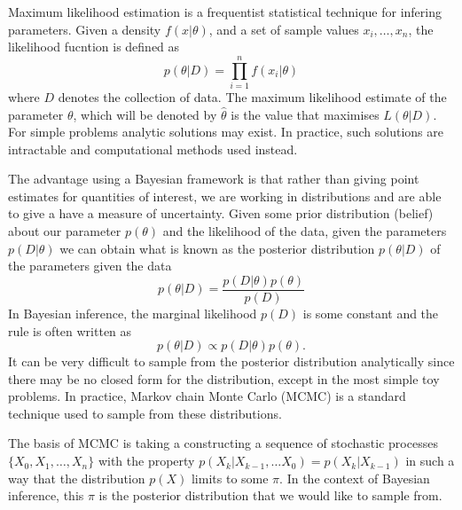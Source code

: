 Maximum likelihood estimation is a frequentist statistical technique for infering parameters. Given a density $f(x|\theta)$, and a set of sample values $x_i,\ldots,x_n$, the likelihood fucntion is defined as  
	\begin{equation}
		p(\theta|D) = \prod_{i=1}^{n}f(x_i|\theta)
	\end{equation}
where $D$ denotes the collection of data. The maximum likelihood estimate of the parameter $\theta$, which will be denoted by $\hat{\theta}$ is the value that maximises $L(\theta|D)$. For simple problems analytic solutions may exist. In practice, such solutions are intractable and computational methods used instead.

The advantage using a Bayesian framework is that rather than giving point estimates for quantities of interest, we are working in distributions and are able to give a have a measure of uncertainty. Given some prior distribution (belief) about our parameter $p(\theta)$ and the likelihood of the data, given the parameters $p(D|\theta)$ we can obtain what is known as the posterior distribution $ p(\theta|D)$ of the parameters given the data 
    \begin{equation}
        p(\theta|D) = \frac{p(D|\theta)p(\theta)}{p(D)}
    \end{equation}
In Bayesian inference, the marginal likelihood $p(D)$ is some constant and the rule is often written as 
    \begin{equation}
        p(\theta|D) \propto p(D|\theta)p(\theta).
    \end{equation}
It can be very difficult to sample from the posterior distribution analytically since there may be no closed form for the distribution, except in the most simple toy problems. In practice, Markov chain Monte Carlo (MCMC) is a standard technique used to sample from these distributions. 

The basis of MCMC is taking a constructing a sequence of stochastic processes $\{X_0,X_1,\ldots,X_n\}$ with the property $p(X_k|X_{k-1},\ldots X_0) = p(X_k|X_{k-1})$ in such a way that the distribution $p(X)$ limits to some $\pi$. In the context of Bayesian inference, this $\pi$ is the posterior distribution that we would like to sample from.